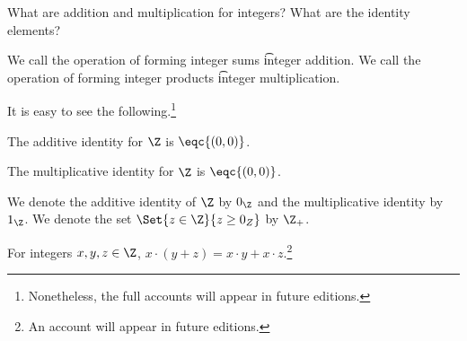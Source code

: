 

What are addition and multiplication for integers?
What are the identity elements?



We call the operation of forming integer sums \t{integer addition}.
We call the operation of forming integer products \t{integer multiplication}.


It is easy to see the following.\footnote{Nonetheless, the full accounts will appear in future editions.}

\begin{proposition}
  The additive identity for $\Z$ is $\eqc{(0, 0)}$.
\end{proposition}

\begin{proposition}
  The multiplicative identity for $\Z$ is $\eqc{(0, 0)}$.
\end{proposition}


We denote the additive identity of $\Z$ by $0_{\Z}$ and the multiplicative identity by $1_{\Z}$.
We denote the set $\Set{z \in \Z}{z \geq 0_{Z}}$ by $\Z_{+}$.


\begin{proposition}
  For integers $x, y, z \in \Z$, $x \cdot (y + z) = x\cdot y + x\cdot z$.\footnote{An account will appear in future editions.}
\end{proposition}

\blankpage
